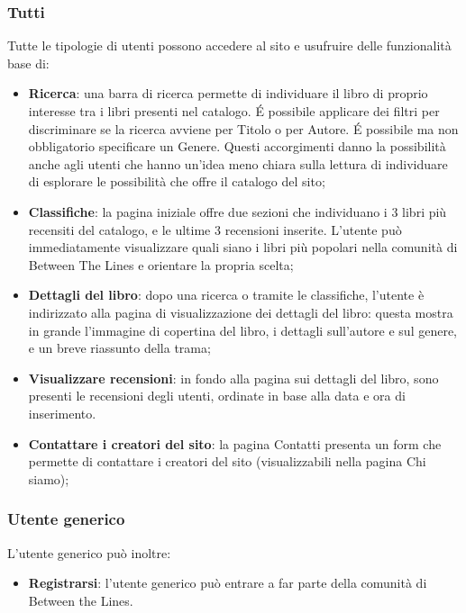 \documentclass[12pt,a4paper,headings=optiontohead]{article}
\begin{document}
	\subsubsection{Tutti}
	Tutte le tipologie di utenti possono accedere al sito e usufruire delle funzionalità base di:
	\begin{itemize}
		\item \textbf{Ricerca}: una barra di ricerca permette di individuare il libro di proprio interesse tra i libri presenti nel catalogo. \'E possibile applicare dei filtri per discriminare se la ricerca avviene per Titolo o per Autore. \'E possibile ma non obbligatorio specificare un Genere. Questi accorgimenti danno la possibilità anche agli utenti che hanno un'idea meno chiara sulla lettura di individuare di esplorare le possibilità che offre il catalogo del sito;
		\item \textbf{Classifiche}: la pagina iniziale offre due sezioni che individuano i 3 libri più recensiti del catalogo, e le ultime 3 recensioni inserite. L'utente può immediatamente visualizzare quali siano i libri più popolari nella comunità di Between The Lines e orientare la propria scelta;
		\item \textbf{Dettagli del libro}: dopo una ricerca o tramite le classifiche, l'utente è indirizzato alla pagina di visualizzazione dei dettagli del libro: questa mostra in grande l'immagine di copertina del libro, i dettagli sull'autore e sul genere, e un breve riassunto della trama;
		\item \textbf{Visualizzare recensioni}: in fondo alla pagina sui dettagli del libro, sono presenti le recensioni degli utenti, ordinate in base alla data e ora di inserimento.
		\item \textbf{Contattare i creatori del sito}: la pagina Contatti presenta un form che permette di contattare i creatori del sito (visualizzabili nella pagina Chi siamo);
	\end{itemize}

	\subsubsection{Utente generico}

	L'utente generico può inoltre:
	\begin{itemize}
		\item \textbf{Registrarsi}: l'utente generico può entrare a far parte della comunità di Between the Lines.
	\end{itemize}
	
\end{document}
